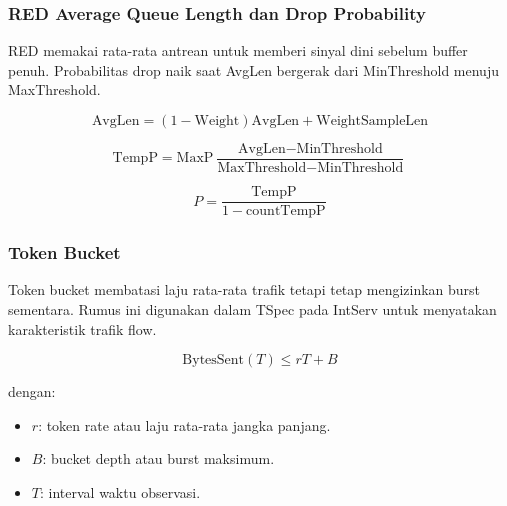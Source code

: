 \subsubsection{RED Average Queue Length dan Drop Probability}
\begin{jawab}
RED memakai rata-rata antrean untuk memberi sinyal dini sebelum buffer penuh. Probabilitas drop naik saat AvgLen bergerak dari MinThreshold menuju MaxThreshold.
\end{jawab}

\begin{equation}
    \text{AvgLen}
    =
    (1-\text{Weight})\text{AvgLen}
    + \text{Weight}\text{SampleLen}
    \label{eq:red-avglen}
\end{equation}

\begin{equation}
    \text{TempP}
    =
    \text{MaxP}
    \frac{\text{AvgLen}-\text{MinThreshold}}
    {\text{MaxThreshold}-\text{MinThreshold}}
    \label{eq:red-tempp}
\end{equation}

\begin{equation}
    P =
    \frac{\text{TempP}}{1-\text{count}\text{TempP}}
    \label{eq:red-p}
\end{equation}

\subsubsection{Token Bucket}
\begin{jawab}
Token bucket membatasi laju rata-rata trafik tetapi tetap mengizinkan burst sementara. Rumus ini digunakan dalam TSpec pada IntServ untuk menyatakan karakteristik trafik flow.
\end{jawab}

\begin{equation}
    \text{BytesSent}(T) \leq rT + B
    \label{eq:token-bucket}
\end{equation}

dengan:
\begin{itemize}
    \item $r$: token rate atau laju rata-rata jangka panjang.
    \item $B$: bucket depth atau burst maksimum.
    \item $T$: interval waktu observasi.
\end{itemize}
